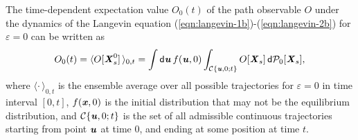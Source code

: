 \documentclass[aip,jcp,a4paper,reprint,onecolumn]{revtex4-1}
\newcommand{\vect}[1]{\textbf{\textit{#1}}}
\newcommand{\dd}{\textsf{d}}
\newcommand{\eps}{\varepsilon}
\newcommand{\mc}{\mathcal C}
\begin{document}
The time-dependent expectation value $O_0(t)$ of the path observable $O$ under the dynamics of the Langevin equation (\ref{eqn:langevin-1b})-(\ref{eqn:langevin-2b}) for $\eps=0$
can be written as
\begin{align}
  O_0( t) =
  \langle O[\vect X^0_s]\,\rangle_{0,t} = 
  \int\dd \vect u\, f(\vect u, 0) 
  \int_{\mc\{\vect u,0; t\}}
  O[\vect X_s]\, \dd\mathcal P_0[\vect X_s],
\end{align}
where 
$\langle \cdot \,\rangle_{0,t}$ is the ensemble average over all possible trajectories for $\eps=0$ in time interval $[0,t]$,
$f(\vect x, 0)$ is the initial distribution that may not be the equilibrium distribution, and
$\mc\{\vect u,0; t\}$ is the set of all admissible continuous trajectories starting from point
$\vect u$ at time $0$, and ending at some position at time $t$.
\end{document}
